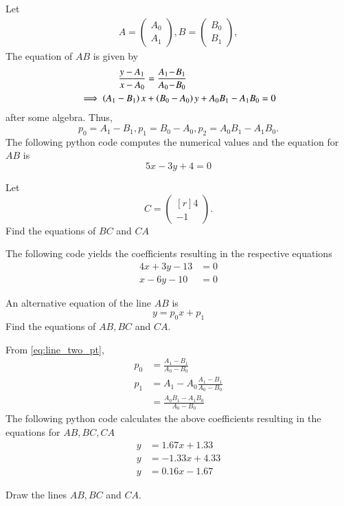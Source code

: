 \documentclass[journal,12pt,twocolumn]{IEEEtran}
\begin{document}
\solution
Let
\begin{align}
A = 
\begin{pmatrix}
A_0
\\
A_1
\end{pmatrix},
B = 
\begin{pmatrix}
B_0
\\
B_1
\end{pmatrix},
\end{align}
%
The equation of $AB$ is given by
%
\begin{align}
\label{eq:line_two_pt}
\frac{y - A_1}{x-A_0} &= \frac{A_1 \! - \! B_1}{A_0 \! - \! B_0} 
\\
\implies \left(A_1 - B_1\right)x &+ \left(B_0-A_0\right)y + A_0B_1 - A_1 B_0 = 0
\label{eq:CA}
\end{align}
%
after some algebra. Thus,
\begin{equation}
p_0 = A_1 - B_1, p_1 = B_0-A_0, p_2 = A_0B_1 - A_1 B_0.
\end{equation}
The following python code computes the numerical values and the equation for $AB$ is
\begin{equation}
5x -3y +4 = 0
\end{equation}

\begin{problem}
Let 
\begin{equation}
C =
\begin{pmatrix*}[r]
4
\\
-1
\end{pmatrix*}.
\end{equation}
%
Find the equations of $BC$ and $CA$
\end{problem}
\solution
The following code yields the coefficients resulting in the respective equations
%
\begin{align}
4x + 3y -13 &= 0
\\
x - 6y - 10 &= 0
\end{align}
%

\begin{problem}
An alternative equation of the line $AB$ is
\begin{equation}
y = p_0x + p_1 
\end{equation}
%
Find the equations of $AB,BC$ and $CA$.
\end{problem}
\solution From \eqref{eq:line_two_pt},
\begin{align}
p_0 &= \frac{A_1 \! - \! B_1}{A_0 \! - \! B_0} 
\\
p_1 &= A_1 - A_0\frac{A_1 \! - \! B_1}{A_0 \! - \! B_0} 
\nonumber\\
&= \frac{A_0 B_1 - A_1B_0}{A_0 \! - \! B_0} 
\end{align}
%
The following python code calculates the above coefficients resulting in the equations for $AB,BC,CA$
\begin{align}
y &=1.67x +1.33
\\
y &=-1.33x + 4.33
\\
y &=0.16x -1.67
\end{align}
\begin{problem}
Draw the lines $AB,BC$ and $CA$.
\end{problem}
%
\end{document}
